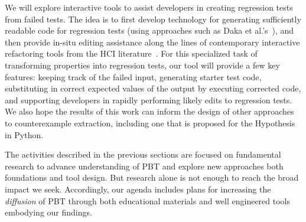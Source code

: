 We will explore interactive tools to assist developers in creating
regression tests from failed tests. The idea is to first develop
technology for generating sufficiently readable code for regression
tests (using
approaches such as Daka et al.'s~\cite{ref:daka2015modeling}), and then provide
in-situ editing assistance along the lines of contemporary interactive
refactoring tools from the HCI
literature~\cite{ref:head2018interactive,ref:barik2016quick,ref:murphyhill2008refactoring,ref:lee2013draganddrop}.
For this specialized task of transforming properties into regression tests,
our tool will provide a few key features:
keeping track of the failed input,
generating starter test code, substituting in correct expected values of the
output by executing corrected code, and supporting developers in rapidly
performing likely edits to regression tests.%
We also hope the results of this work
can inform the
design of other approaches to counterexample extraction, including one that is
proposed for the Hypothesis in Python.


The activities described in the previous sections are focused on
fundamental research to advance understanding of PBT and explore new
approaches both foundations and tool design.  But research alone is
not enough to reach the broad impact we seek. Accordingly, our agenda
includes plans for increasing the {\em diffusion} of PBT through both
educational materials and well engineered tools
embodying our findings.

